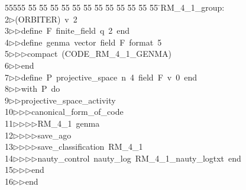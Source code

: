 %
%
\begin{tabbing}
55555 \= 55 \= 55 \= 55 \= 55 \= 55 \= 55 \= 55 \= 55 \= 55 \= 55 \= 55 \= 55 \= \>RM\_4\_1\_group:\\[0pt]
2\>$\triangleright$\>(ORBITER)\ v\ 2\ \\[0pt]
3\>$\triangleright$\>$\triangleright$\>define\ F\ finite\_field\ q\ 2\ end\ \\[0pt]
4\>$\triangleright$\>$\triangleright$\>define\ genma\ vector\ field\ F\ format\ 5\ \\[0pt]
5\>$\triangleright$\>$\triangleright$\>$\triangleright$\>compact\ (CODE\_RM\_4\_1\_GENMA)\ \\[0pt]
6\>$\triangleright$\>$\triangleright$\>end\ \\[0pt]
7\>$\triangleright$\>$\triangleright$\>define\ P\ projective\_space\ n\ 4\ field\ F\ v\ 0\ end\ \\[0pt]
8\>$\triangleright$\>$\triangleright$\>with\ P\ do\ \\[0pt]
9\>$\triangleright$\>$\triangleright$\>projective\_space\_activity\ \\[0pt]
10\>$\triangleright$\>$\triangleright$\>$\triangleright$\>canonical\_form\_of\_code\ \\[0pt]
11\>$\triangleright$\>$\triangleright$\>$\triangleright$\>$\triangleright$\>RM\_4\_1\ genma\ \\[0pt]
12\>$\triangleright$\>$\triangleright$\>$\triangleright$\>$\triangleright$\>save\_ago\ \\[0pt]
13\>$\triangleright$\>$\triangleright$\>$\triangleright$\>$\triangleright$\>save\_classification\ RM\_4\_1\ \\[0pt]
14\>$\triangleright$\>$\triangleright$\>$\triangleright$\>$\triangleright$\>nauty\_control\ nauty\_log\ RM\_4\_1\_nauty\_logtxt\ end\ \\[0pt]
15\>$\triangleright$\>$\triangleright$\>$\triangleright$\>end\ \\[0pt]
16\>$\triangleright$\>$\triangleright$\>end\\[0pt]

\end{tabbing}
